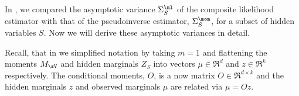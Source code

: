 \subsection{}
\label{app:pw-proof}

In , we compared the asymptotic variance
  $\Sigma^\ml_S$ of the composite likelihood estimator
  with that of the pseudoinverse estimator, $\Sigma^\mom_S$,
  for a subset of hidden variables $S$.
  Now we will derive these asymptotic variances in detail.

Recall, that in  we simplified notation by taking
  $m=1$ and flattening the moments $M_\sV$ and hidden marginals $Z_S$
  into vectors $\mu \in \Re^d$ and $z \in \Re^k$ respectively. The
  conditional moments, $O$, is a now matrix $O \in \Re^{d\times k}$ and
  the hidden marginals $z$ and observed marginals $\mu$ are related via
  $\mu = O z$.
%
%
%

